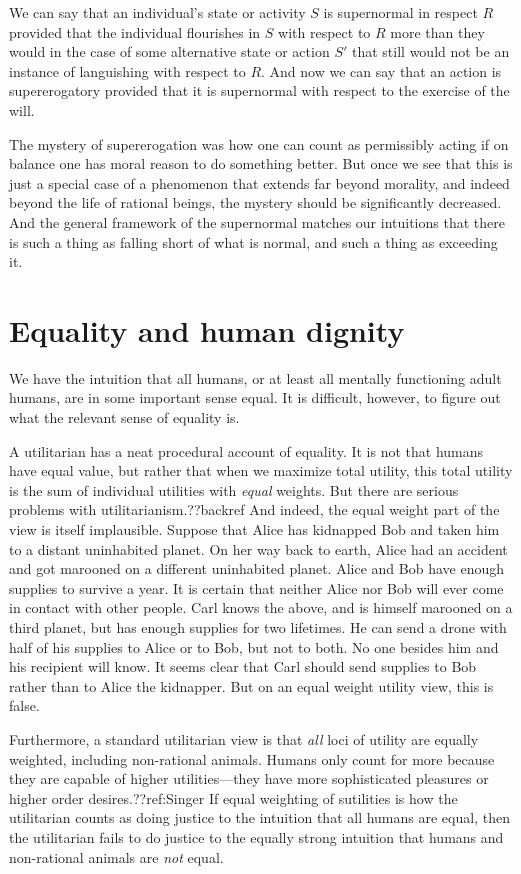 We can say that an individual's state or activity $S$ is supernormal in respect $R$ provided that the individual flourishes 
in $S$ with respect to $R$ more than they would in the case of some alternative state or action $S'$ that
still would not be an instance of languishing with respect to $R$. And now we can say that an action is supererogatory
provided that it is supernormal with respect to the exercise of the will. 

The mystery of supererogation was how one can count as permissibly acting if on balance one has moral reason to do something 
better. But once we see that this is just a special case of a phenomenon that extends far beyond morality, and indeed beyond
the life of rational beings, the mystery should be significantly decreased. And the general framework of the supernormal
matches our intuitions that there is such a thing as falling short of what is normal, and such a thing as exceeding it.

\section{Equality and human dignity}
We have the intuition that all humans, or at least all mentally functioning adult humans, are in some important sense 
equal. It is difficult, however, to figure out what the relevant sense of equality is.

A utilitarian has a neat procedural account of equality. It is not that humans have equal value, but rather
that when we maximize total utility, this total utility is the sum of
individual utilities with \textit{equal} weights. But there are serious problems with
utilitarianism.??backref And indeed, the equal weight part of the view is itself implausible. Suppose that 
Alice has kidnapped Bob and taken him to a distant uninhabited planet. On her way back to earth, Alice 
had an accident and got marooned on a different uninhabited planet. Alice and Bob have enough supplies to
survive a year. It is certain that neither Alice nor Bob will ever come in contact with other people. 
Carl knows the above, and is himself marooned on a third planet, but has enough 
supplies for two lifetimes. He can send a drone with half of his supplies to Alice or to Bob, but not to
both. No one besides him and his recipient will know. It seems clear that Carl should send supplies to
Bob rather than to Alice the kidnapper. But on an equal weight utility view, this is false.

Furthermore, a standard utilitarian view is that \textit{all} loci of utility are equally weighted, including
non-rational animals. Humans only count for more because they are capable of higher utilities---they have more
sophisticated pleasures or higher order desires.??ref:Singer If equal weighting of sutilities
is how the utilitarian counts as doing justice to the intuition that all humans are equal, then the utilitarian
fails to do justice to the equally strong intuition that humans and non-rational animals are \textit{not} equal.


